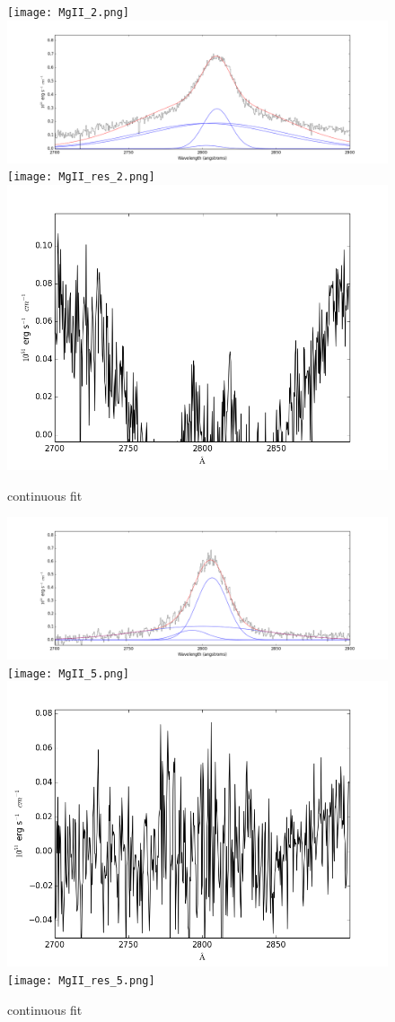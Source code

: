 \documentclass[usenatbib]{mn2e}
\begin{document}
\newpage

\begin{figure}
\begin{center}
\texttt{[image: MgII\_2.png]}
\vspace{5mm}
\includegraphics[width=0.49\linewidth,angle=0]{MgII_3.png}\\
\texttt{[image: MgII\_res\_2.png]}
\hspace{5mm}
\includegraphics[width=0.49\linewidth,angle=0]{MgII_res_3.png}\\
\end{center} 
\caption{continuous fit \label{fig:landscape}}   
\end{figure}

\newpage


\begin{figure}
\begin{center}
\includegraphics[width=0.46\linewidth,angle=0]{MgII_4.png}
\vspace{5mm}
\texttt{[image: MgII\_5.png]}\\
\includegraphics[width=0.46\linewidth,angle=0]{MgII_res_4.png}
\hspace{5mm}
\texttt{[image: MgII\_res\_5.png]}\\
\end{center} 
\caption{continuous fit \label{fig:landscape}}   
\end{figure}
\end{document}
